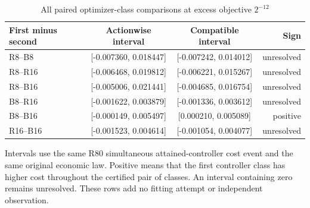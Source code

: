 \begin{table}[htbp]
\centering
\caption{All paired optimizer-class comparisons at excess objective $2^{-12}$}\label{tab:comparisons84}
{\small\setlength{\tabcolsep}{3pt}
\begin{tabular}{lccr}
\hline
First minus second & Actionwise interval & Compatible interval & Sign \\
\hline
R8--B8 & [-0.007360, 0.018447] & [-0.007242, 0.014012] & unresolved \\
R8--R16 & [-0.006468, 0.019812] & [-0.006221, 0.015267] & unresolved \\
R8--B16 & [-0.005006, 0.021441] & [-0.004685, 0.016754] & unresolved \\
B8--R16 & [-0.001622, 0.003879] & [-0.001336, 0.003612] & unresolved \\
B8--B16 & [-0.000149, 0.005497] & [0.000210, 0.005089] & positive \\
R16--B16 & [-0.001523, 0.004614] & [-0.001054, 0.004077] & unresolved \\
\hline
\end{tabular}}
\par\smallskip
{\footnotesize Intervals use the same R80 simultaneous attained-controller cost event and the same original economic law. Positive means that the first controller class has higher cost throughout the certified pair of classes. An interval containing zero remains unresolved. These rows add no fitting attempt or independent observation.}
\end{table}
